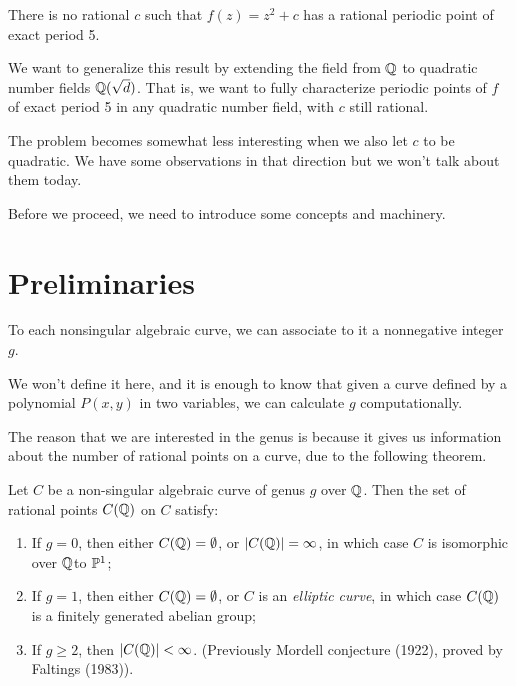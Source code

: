 \begin{theorem}[FPS, 1996]
  There is no rational $c$ such that $f(z) = z^2 + c$ has a rational
  periodic point of exact period 5.
\end{theorem}

We want to generalize this result by extending the field from $\Q$ to
quadratic number fields $\Q(\sqrt{d})$. That is, we want to fully
characterize periodic points of $f$ of exact period 5 in any quadratic
number field, with $c$ still rational.

\begin{remark}
  The problem becomes somewhat less interesting when we also let $c$
  to be quadratic. We have some observations in that direction but we
  won't talk about them today.
\end{remark}

Before we proceed, we need to introduce some concepts and machinery.

\section{Preliminaries}

\begin{definition}
  To each nonsingular algebraic curve, we can associate to it a
  nonnegative integer $g$.
\end{definition}

\begin{remark}
  We won't define it here, and it is enough to know that given a curve
  defined by a polynomial $P(x, y)$ in two variables, we can calculate
  $g$ computationally.

  The reason that we are interested in the genus is because it gives
  us information about the number of rational points on a curve, due
  to the following theorem.
\end{remark}

\begin{theorem}[Faltings, 1983]
Let $C$ be a non-singular algebraic curve of genus $g$ over $\Q$. Then
the set of rational points $C(\Q)$ on $C$ satisfy:
\begin{enumerate}
\item If $g = 0$, then either $C(\Q) = \es$, or $|C(\Q)| = \infty$, in which
  case $C$ is isomorphic over $\Q$to $\P^1$;

\item If $g = 1$, then either $C(\Q) = \es$, or $C$ is an
  \emph{elliptic curve}, in which case $C(\Q)$ is a finitely generated
  abelian group;

\item If $g \ge 2$, then $|C(\Q)| < \infty$. (Previously Mordell
  conjecture (1922), proved by Faltings (1983)).
\end{enumerate}
\end{theorem}

